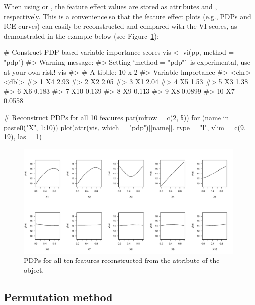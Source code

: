 When using  or , the feature effect values are stored as attributes  and , respectively. This is a convenience so that the feature effect plots (e.g., PDPs and ICE curves) can easily be reconstructed and compared with the VI scores, as demonstrated in the example below (see Figure~\ref{fig:pdp-from-attr}):

\begin{example}
# Construct PDP-based variable importance scores
vis <- vi(pp, method = "pdp")
#> Warning message:
#> Setting `method = "pdp"` is experimental, use at your own risk! 
vis
#> # A tibble: 10 x 2
#>    Variable Importance
#>    <chr>         <dbl>
#>  1 X4           2.93  
#>  2 X2           2.05  
#>  3 X1           2.04  
#>  4 X5           1.53  
#>  5 X3           1.38  
#>  6 X6           0.183 
#>  7 X10          0.139 
#>  8 X9           0.113 
#>  9 X8           0.0899
#> 10 X7           0.0558

# Reconstruct PDPs for all 10 features
par(mfrow = c(2, 5))
for (name in paste0("X", 1:10)) {
  plot(attr(vis, which = "pdp")[[name]], type = "l", ylim = c(9, 19), las = 1)
}
\end{example}

\begin{figure}[!htb]
  \centering 
  \includegraphics[width=1\linewidth]{figures/pdp-from-attr.pdf} 
  \caption{PDPs for all ten features reconstructed from the  attribute of the  object.}
  \label{fig:pdp-from-attr}
\end{figure}

\subsection{Permutation method}

